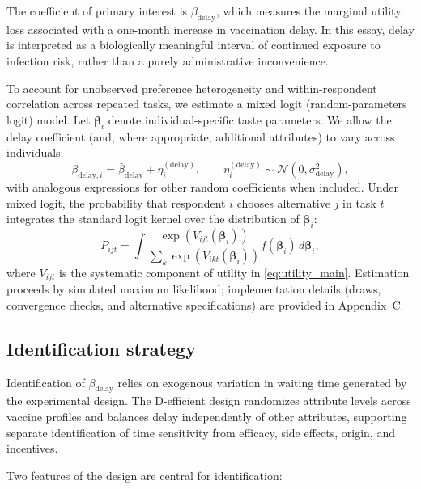 \documentclass[doublespacing]{utdthesis}
\begin{document}
The coefficient of primary interest is $\beta_{\text{delay}}$, which measures the marginal utility loss associated with a one-month increase in vaccination delay. In this essay, delay is interpreted as a biologically meaningful interval of continued exposure to infection risk, rather than a purely administrative inconvenience.

To account for unobserved preference heterogeneity and within-respondent correlation across repeated tasks, we estimate a mixed logit (random-parameters logit) model. Let $\boldsymbol{\beta}_i$ denote individual-specific taste parameters. We allow the delay coefficient (and, where appropriate, additional attributes) to vary across individuals:
\begin{equation}
\beta_{\text{delay},i} = \bar{\beta}_{\text{delay}} + \eta^{(\text{delay})}_i,
\qquad
\eta^{(\text{delay})}_i \sim \mathcal{N}(0,\sigma^2_{\text{delay}}),
\label{eq:random_delay}
\end{equation}
with analogous expressions for other random coefficients when included. Under mixed logit, the probability that respondent $i$ chooses alternative $j$ in task $t$ integrates the standard logit kernel over the distribution of $\boldsymbol{\beta}_i$:
\begin{equation}
P_{ijt}=\int
\frac{\exp\!\left(V_{ijt}(\boldsymbol{\beta}_i)\right)}
{\sum_{k}\exp\!\left(V_{ikt}(\boldsymbol{\beta}_i)\right)}
f(\boldsymbol{\beta}_i)\, d\boldsymbol{\beta}_i,
\label{eq:mxl_prob}
\end{equation}
where $V_{ijt}$ is the systematic component of utility in \eqref{eq:utility_main}. Estimation proceeds by simulated maximum likelihood; implementation details (draws, convergence checks, and alternative specifications) are provided in Appendix~C.

\subsection*{Identification strategy}

Identification of $\beta_{\text{delay}}$ relies on exogenous variation in waiting time generated by the experimental design. The D-efficient design randomizes attribute levels across vaccine profiles and balances delay independently of other attributes, supporting separate identification of time sensitivity from efficacy, side effects, origin, and incentives.

Two features of the design are central for identification:
\end{document}
